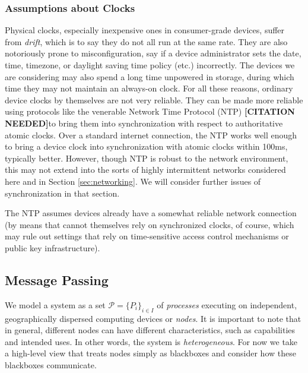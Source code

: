 \documentclass[]             %
{NASA}                       %
\theoremstyle{definition}
\newcommand{\citationneeded}{\textbf{[CITATION NEEDED]}}
\begin{document}
\subsubsection{Assumptions about Clocks}
Physical clocks, especially inexpensive ones in consumer-grade
devices, suffer from \emph{drift}, which is to say they do not all run
at the same rate. They are also notoriously prone to misconfiguration,
say if a device administrator sets the date, time, timezone, or
daylight saving time policy (etc.) incorrectly. The devices we are
considering may also spend a long time unpowered in storage, during
which time they may not maintain an always-on clock.  For all these
reasons, ordinary device clocks by themselves are not very
reliable. They can be made more reliable using protocols like the
venerable Network Time Protocol (NTP) \citationneeded to bring them
into synchronization with respect to authoritative atomic clocks. Over
a standard internet connection, the NTP works well enough to bring a
device clock into synchronization with atomic clocks within 100ms,
typically better. However, though NTP is robust to the network
environment, this may not extend into the sorts of highly intermittent
networks considered here and in Section \ref{sec:networking}. We will
consider further issues of synchronization in that section.

The NTP assumes devices already have a somewhat reliable network connection
(by means that cannot themselves rely on synchronized clocks, of
course, which may rule out settings that rely on time-sensitive access
control mechanisms or public key infrastructure).


\subsection{Message Passing}
\label{ssec:message-passing}

We model a system as a set \(\mathcal{P} = \{P_i\}_{i\in I}\) of
\emph{processes} executing on independent, geographically dispersed
computing devices or \emph{nodes}. It is important to note that in
general, different nodes can have different characteristics, such as
capabilities and intended uses. In other words, the system is
\emph{heterogeneous}. For now we take a high-level view that treats
nodes simply as blackboxes and consider how these blackboxes
communicate.
\end{document}
